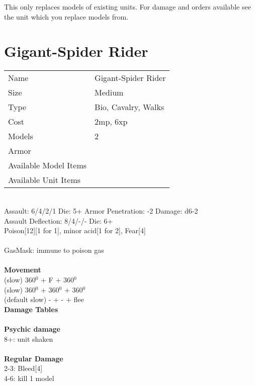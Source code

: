 This only replaces models of existing units. For damage and orders available see the unit which you replace models from.



\pagebreak

\section{ Gigant-Spider Rider }

\begin{tabular}{ll}
  Name & Gigant-Spider Rider \\
  Size & Medium\\
  Type & Bio, Cavalry, Walks\\
  Cost & 2mp, 6xp\\
  Models & 2\\
  Armor & \\
  Available Model Items &  \\
  Available Unit Items &  \\
\end{tabular}

\ \\
Assault: 6/4/2/1 Die: 5+ Armor Penetration: -2 Damage: d6-2 \\
Assault Deflection: 8/4/-/- Die: 6+\\
\indent Poison[12][1 for 1], minor acid[1 for 2], Fear[4] \\
\ \\
GasMask: immune to poison gas
\ \\


\ \\ {\bf Movement } \\
(slow) 360$^0$ + F + 360$^0$ \\
(slow) 360$^0$ + 360$^0$ + 360$^0$ \\
(default slow) - + - + flee \\



{\bf Damage Tables} \\
\ \\ {\bf Psychic damage } \\
8+: unit shaken \\
\ \\ {\bf Regular Damage } \\
2-3: Bleed[4] \\
4-6: kill 1 model \\









